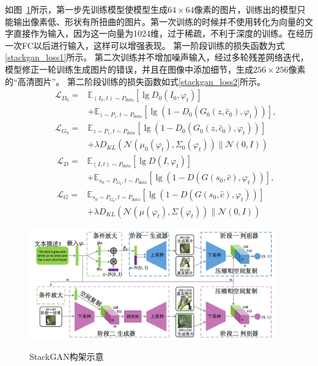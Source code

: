   如图~\ref{fig:StackGAN}所示，第一步先训练模型使模型生成$64\times 64$像素的图片，训练出的模型只能输出像素低、形状有所扭曲的图片。第一次训练的时候并不使用转化为向量的文字直接作为输入，因为这一向量为1024维，过于稀疏，不利于深度的训练。在经历一次FC以后进行输入，这样可以增强表现。
  第一阶段训练的损失函数为式\eqref{stackgan_loss1}所示。
  第二次训练并不增加噪声输入，经过多轮残差网络迭代，
  模型修正一轮训练生成图片的错误，并且在图像中添加细节，生成$256\times256$像素的“高清图片”。
  第二阶段训练的损失函数如式\eqref{stackgan_loss2}所示。
  \begin{equation}
    \begin{aligned}
      &&\mathcal{L}_{D_0} = & \mathbb{E}_{(I_0,t) \sim P_{data}}[\lg D_0 (I_0,\varphi_t)] \\ && &+\mathbb{E}_{z\sim P_z,t \sim P_{data}}[\lg (1-D_0(G_0(z, \hat{c}_0 ),\varphi_t))],
      \\
      &&\mathcal{L}_{G_0} = & \mathbb{E}_{z\sim P_z,t \sim P_{data}}[\lg (1-D_0(G_0(z, \hat{c}_0 ),\varphi_t))]  \\ && &+\lambda D_{KL}(\mathcal{N}(\mu_0(\varphi_t),\Sigma_0(\varphi_t))\parallel \mathcal{N}(0,I))
      \end{aligned}
    \label{stackgan_loss1}
  \end{equation}
  \begin{equation}
    \begin{aligned}
      &&\mathcal{L}_{D} = & \mathbb{E}_{(I,t) \sim P_{data}}[\lg D (I,\varphi_t)] \\ && &+\mathbb{E}_{s_0\sim P_{G_0},t \sim P_{data}}[\lg (1-D(G(s_0, \hat{c} ),\varphi_t))],
      \\
      &&\mathcal{L}_{G} = & \mathbb{E}_{s_0\sim P_{G_0},t \sim P_{data}}[\lg (1-D(G(s_0, \hat{c} ),\varphi_t))]  \\ && &+\lambda D_{KL}(\mathcal{N}(\mu(\varphi_t),\Sigma(\varphi_t))\parallel \mathcal{N}(0,I))
      \end{aligned}
    \label{stackgan_loss2}
  \end{equation}
    
  \begin{figure}[!htb]
    \centering
    \includegraphics[width=0.95\textwidth]{figures/StackGAN.png}\\
    \caption{StackGAN构架示意}
    \label{fig:StackGAN}
  \end{figure}


